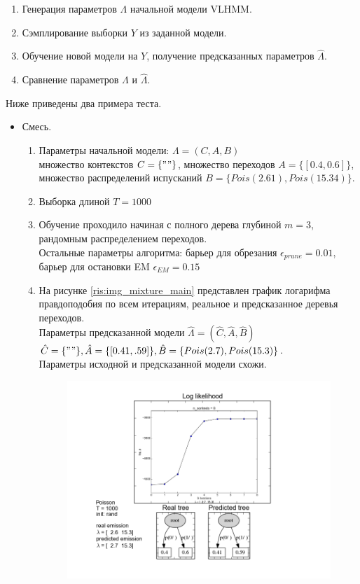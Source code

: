 \documentclass{matmex-diploma-custom}
\begin{document}
{\begin{enumerate}
\item
Генерация параметров $ \Lambda $ начальной модели VLHMM.
\item
Сэмплирование выборки $ Y $ из заданной модели.
\item
Обучение новой модели на $ Y $, получение предсказанных параметров $\hat{\Lambda}$.
\item
Сравнение параметров $ \Lambda $ и $ \hat{\Lambda} $.
\end{enumerate}

Ниже приведены два примера теста.
\begin{itemize}
\item Смесь.
\begin{enumerate}
\item Параметры начальной модели: $\Lambda = (C, A, B)$ 
\\множество контекстов $C = \{""\}$, множество переходов $A = \{[0.4, 0.6]\}$, множество распределений испусканий $B = \{Pois(2.61), Pois(15.34)\}$. 
\item Выборка длиной $ T = 1000 $
\item Обучение проходило начиная с полного дерева глубиной $ m  = 3$, рандомным распределением переходов. 
\\Остальные параметры алгоритма: барьер для обрезания $ \epsilon_{prune} = 0.01$, барьер для остановки EM $ \epsilon_{EM} =  0.15 $      
\item На рисунке \ref{ris:img_mixture_main} представлен график логарифма правдоподобия по всем итерациям, реальное и предсказанное деревья переходов.
\\Параметры предсказанной модели $\hat{\Lambda} = (\hat{C}, \hat{A}, \hat{B})$  
\\$\hat{C} = \{""\}, \hat{A} = \{[0.41, .59]\}, \hat{B} = \{Pois(2.7), Pois(15.3)\}$.
\\Параметры исходной и предсказанной модели схожи.
\begin{figure}[ht]\centering
	\includegraphics[scale=0.5]{img/sample_mixture/main.png}

\end{figure}
\end{enumerate}
\end{itemize}}
\end{document}
